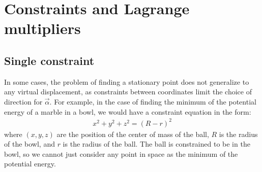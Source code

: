 \section{Constraints and Lagrange multipliers}
\subsection{Single constraint}
In some cases, the problem of finding a stationary point does not generalize to any virtual displacement, as constraints between coordinates limit the choice of direction for $\vec{\alpha}$. For example, in the case of finding the minimum of the potential energy of a marble in a bowl, we would have a constraint equation in the form:
\begin{align}
x^2+y^2+z^2=(R-r)^2
\end{align}
where $(x,y,z)$ are the position of the center of mass of the ball, $R$ is the radius of the bowl, and $r$ is the radius of the ball. The ball is constrained to be in the bowl, so we cannot just consider any point in space as the minimum of the potential energy.

